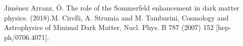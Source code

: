 \documentclass[11pt,spanish]{article}
\begin{document}





\noindent
[1] Jiménez Arranz, Ó. The role of the Sommerfeld enhancement in dark matter physics. (2018).\newline
[2] M. Cirelli, A. Strumia and M. Tamburini, Cosmology and Astrophysics of Minimal Dark
Matter, Nucl. Phys. B 787 (2007) 152 [hep-ph/0706.4071].











\end{document}
